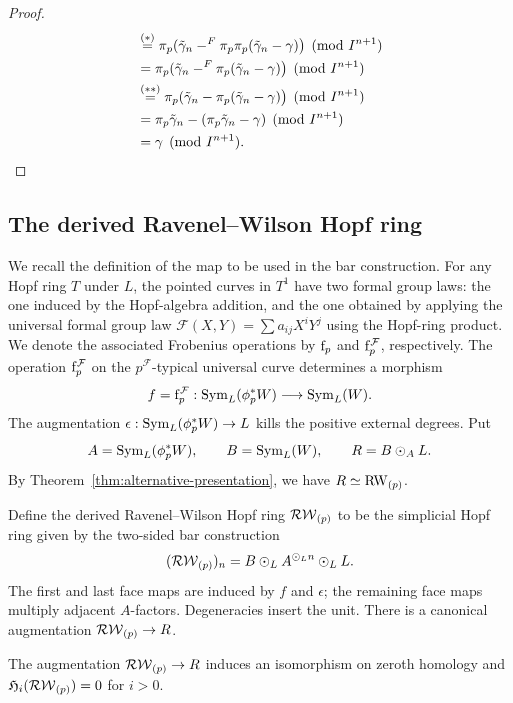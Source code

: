 \begin{proof}
\begin{align*}
&\stackrel{(*)}{=}\mathrm \pi_p(\tilde\gamma_{n} -^F \mathrm \pi_p\mathrm \pi_p(\tilde \gamma_{n}-\gamma)\big) \pmod{I^{n+1}} \\
&=\mathrm \pi_p(\tilde\gamma_{n} -^F \mathrm \pi_p(\tilde \gamma_{n}-\gamma)\big) \pmod{I^{n+1}} \\
&\stackrel{(**)}{=}\mathrm \pi_p(\tilde\gamma_{n} - \mathrm \pi_p(\tilde \gamma_{n}-\gamma)\big) \pmod{I^{n+1}} \\
&=\mathrm \pi_p\tilde\gamma_{n} - (\mathrm \pi_p\tilde \gamma_{n}-\gamma) \pmod{I^{n+1}} \\
&=\gamma \pmod{I^{n+1}}.
\end{align*}
\end{proof}



\subsection{The derived Ravenel--Wilson Hopf ring}\label{app:rw-bar}
We recall the definition of the map to be used in the bar construction. For any Hopf ring $T$ under $L$, the pointed curves in $T^1$ have two formal group laws: the one induced by the Hopf-algebra addition, and the one obtained by applying the universal formal group law $\mathcal F(X,Y)=\sum a_{ij}X^iY^j$ using the Hopf-ring product. We denote the associated Frobenius operations by $\mathrm f_p$ and $\mathrm f_p^{\mathcal F}$, respectively. The operation $\mathrm f_p^{\mathcal F}$ on the $p^{\mathcal F}$-typical universal curve determines a morphism
\[
 f=\mathrm f_p^{\mathcal F}:\mathrm{Sym}_L(\phi_p^*W)\longrightarrow \mathrm{Sym}_L(W).
\]
The augmentation $\epsilon:\mathrm{Sym}_L(\phi_p^*W)\to L$ kills the positive external degrees. Put
\[
 A=\mathrm{Sym}_L(\phi_p^*W),\qquad B=\mathrm{Sym}_L(W),\qquad
 R=B\odot_A L.
\]
By Theorem~\ref{thm:alternative-presentation}, we have $R\simeq\mathrm{RW}_{(p)}$.

\begin{definition}\label{def:rw-bar}
Define the derived Ravenel--Wilson Hopf ring $\mathcal{RW}_{(p)}$ to be the simplicial Hopf ring given by the two-sided bar construction
\[
 (\mathcal{RW}_{(p)})_n=B\odot_L A^{\odot_L n}\odot_L L.
\]
The first and last face maps are induced by $f$ and $\epsilon$; the remaining face maps multiply adjacent $A$-factors. Degeneracies insert the unit. There is a canonical augmentation $\mathcal{RW}_{(p)}\to R$.
\end{definition}

\begin{theorem}\label{thm:rw-bar-exact}
The augmentation $\mathcal{RW}_{(p)}\to R$ induces an isomorphism on zeroth homology and $\mathfrak H_i(\mathcal{RW}_{(p)})=0$ for $i>0$.
\end{theorem}

